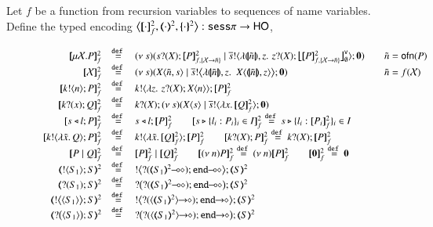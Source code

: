 \begin{definition}\label{d:enc:fotohorec}
	Let $f$ be a function from recursion variables to sequences of name variables.
%
Define the typed encoding $\enco{\map{\cdot}^{2}_f, \mapt{\cdot}^{2}, \mapa{\cdot}^{2}}: \sessp \to \HO$,
\begin{figure}[t]
\[
	\begin{array}{rcll}
		\pmapp{\recp{X}{P}}{2}{f} &\defeq&
		\newsp{s}{\binp{s}{\X} \pmapp{P}{2}{{f,\{\rvar{X}\to \tilde{n}\}}} \Par \bout{\dual{s}}{\abs{\vmap{\tilde{n}}, z } \,{\binp{z}{\X} \auxmapp{\pmapp{P}{2}{{f,\{\rvar{X}\to \tilde{n}\}}}}{\mathsf{v}}{\es}}} \inact} & \quad \tilde{n} = \ofn{P} \\ 
		\pmapp{\rvar{X}}{2}{f} &\defeq& \newsp{s}{\appl{\X}{\tilde{n}, s} \Par \bbout{\dual{s}}{ \abs{\vmap{\tilde{n}},z}\,\,{\appl{X}{ \vmap{\tilde{n}}, z}}} \inact} & \quad \tilde{n} = f(\rvar{X}) \\
		\pmapp{\bout{k}{n} P}{2}{f}	&\defeq&	\bout{k}{ \abs{z}{\,\binp{z}{X} \appl{X}{n}} } \pmapp{P}{2}{f} \\
		\pmapp{\binp{k}{x} Q}{2}{f}	&\defeq&	\binp{k}{X} \newsp{s}{\appl{X}{s} \Par \bout{\dual{s}}{\abs{x}{\pmapp{Q}{2}{f}}} \inact} \\


		\pmapp{\bsel{s}{l} P}{2}{f} &\defeq& \bsel{s}{l} \pmapp{P}{2}{f} \qquad
		\pmapp{\bbra{s}{l_i: P_i}_i \in I}{2}{f} \defeq \bbra{s}{l_i: \pmapp{P_i}{2}{f}}_i \in I\\
		\pmapp{\bout{k}{\abs{\tilde{x}}{Q}} P}{2}{f} &\defeq& \bout{k}{\abs{\tilde{x}}{\pmapp{Q}{2}{f}}} \pmapp{P}{2}{f} \qquad
		\pmapp{\binp{k}{X} P}{2}{f} \defeq \binp{k}{X} \pmapp{P}{2}{f}\\

		\pmapp{P \Par Q}{2}{f} &\defeq& \pmapp{P}{2}{f} \Par \pmapp{Q}{2}{f} \qquad
		\pmapp{\news{n} P}{2}{f} \defeq \news{n} \pmapp{P}{2}{f} \qquad

		\pmapp{\inact}{2}{f} \defeq \inact\\


		\tmap{\btout{S_1} {S} }{2}	&\defeq&	\bbtout{\lhot{\btinp{\lhot{\tmap{S_1}{2}}}\tinact}} \tmap{S}{2}  \\
		\tmap{\btinp{S_1} S }{2}	&\defeq&	\bbtinp{\lhot{\btinp{\lhot{\tmap{S_1}{2}}}\tinact}} \tmap{S}{2} \\
		\tmap{\bbtout{\chtype{S_1}} {S} }{2}	&\defeq&	\bbtout{\shot{\btinp{\shot{\chtype{\tmap{S_1}{2}}}}\tinact}} \tmap{S}{2}  \\
		\tmap{\bbtinp{\chtype{S_1}} {S} }{2}	&\defeq&	\bbtinp{\shot{\btinp{\shot{\chtype{\tmap{S_1}{2}}}}\tinact}} \tmap{S}{2} \\


\end{array}\]
\end{figure}
\end{definition}
